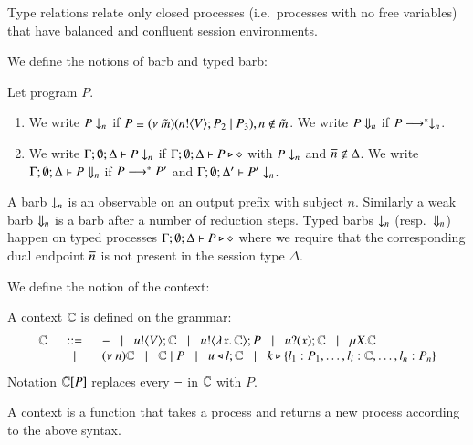 Type relations relate only closed processes
(i.e.\ processes with no free variables)
that have balanced and confluent session environments.

We define the notions of barb and typed barb:
%
\begin{definition}[Barbs]\rm
	Let program $P$.
	\begin{enumerate}
		\item	We write $P \downarrow_{n}$ if $P \equiv (\nu\ \tilde{m})(n ! \langle V \rangle ; P_2 \;|\; P_3), n \notin \tilde{m}$.
			We write $P \Downarrow_{n}$ if $P \longrightarrow^* \downarrow_{n}$.

		\item	We write $\Gamma; \emptyset; \Delta \vdash P \downarrow_{n}$ if
			$\Gamma; \emptyset; \Delta \vdash P \triangleright \diamond$ with $P \downarrow_{n}$ and $\overline{n} \notin \Delta$.
			We write $\Gamma; \emptyset; \Delta \vdash P \Downarrow_{n}$ if $P \longrightarrow^* P'$ and
			$\Gamma; \emptyset; \Delta' \vdash P' \downarrow_{n}$.			
	\end{enumerate}
\end{definition}
%
A barb $\downarrow_{n}$ is an observable on an output prefix with subject $n$.
Similarly a weak barb $\Downarrow_{n}$ is a barb after a number of reduction steps.
Typed barbs $\downarrow_{n}$ (resp.\ $\Downarrow_{n}$)
happen on typed processes $\Gamma; \emptyset; \Delta \vdash P \triangleright \diamond$
where we require that the corresponding dual endpoint $\overline{n}$ is not present
in the session type $\Delta$.

We define the notion of the context:
%
\begin{definition}[Context]\rm
	A context ${\Bbb C}$ is defined on the grammar:
%
\[
	\begin{array}{rcl}
		{\Bbb C} &\;\;::=\;\;& - \;\;\;|\;\;\; u ! \langle V \rangle ; {\Bbb C} \;\;\;|\;\;\; u ! \langle \lambda x.\,{\Bbb C} \rangle ; P \;\;\;|\;\;\; u ? (x) ; {\Bbb C} \;\;\;|\;\;\; \mu X. {\Bbb C}\\
		& \;\;\;|\;\;\; & (\nu\ n) {\Bbb C} \;\;\;|\;\;\; {\Bbb C} \;|\; P \;\;\;|\;\;\; u \triangleleft l ; {\Bbb C} \;\;\;|\;\;\; k \triangleright \{l_1: P_1, \dots, l_i:{\Bbb C}, \dots, l_n: P_n\}
	\end{array}
\]
%
	Notation ${\Bbb C}[P]$ replaces every $-$ in ${\Bbb C}$ with $P$.
\end{definition}
%
\noi A context is a function that takes a process and returns a new process
according to the above syntax.

